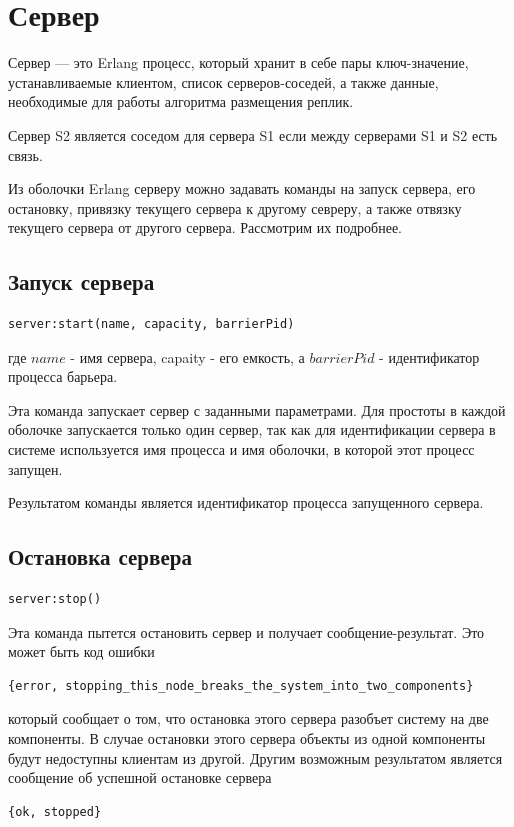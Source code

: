 	\section{Сервер}
		Сервер --- это Erlang процесс, который хранит в себе пары ключ-значение, устанавливаемые клиентом, список серверов-соседей, а также
		данные, необходимые для работы алгоритма размещения реплик. 
		
		Сервер S2 является соседом для сервера S1 если между серверами S1 и S2 есть связь.
		
		Из оболочки Erlang серверу можно задавать команды на запуск сервера, его остановку,
		привязку текущего сервера к другому севреру, а также отвязку текущего сервера от другого сервера. Рассмотрим их подробнее.

		\subsection{Запуск сервера}
			\begin{lstlisting}
server:start(name, capacity, barrierPid)
			\end{lstlisting}
			где $name$ - имя сервера, capaity - его емкость, а $barrierPid$ - идентификатор процесса барьера.
			
			Эта команда запускает сервер с заданными параметрами. Для простоты в каждой оболочке запускается только один сервер, так как
			для идентификации сервера в системе используется имя процесса и имя оболочки, в которой этот процесс запущен.

			Результатом команды является идентификатор процесса запущенного сервера.

		\subsection{Остановка сервера}
			\begin{lstlisting}
server:stop()
			\end{lstlisting}
			Эта команда пытется остановить сервер и получает сообщение-результат. Это может быть код ошибки
			\begin{lstlisting}
{error, stopping_this_node_breaks_the_system_into_two_components}
			\end{lstlisting}
			который сообщает о том, что остановка этого сервера разобъет систему на две компоненты. В случае остановки этого сервера
			объекты из одной компоненты будут недоступны клиентам из другой. Другим возможным результатом является сообщение об успешной
			остановке сервера
			\begin{lstlisting}
{ok, stopped}
			\end{lstlisting}

